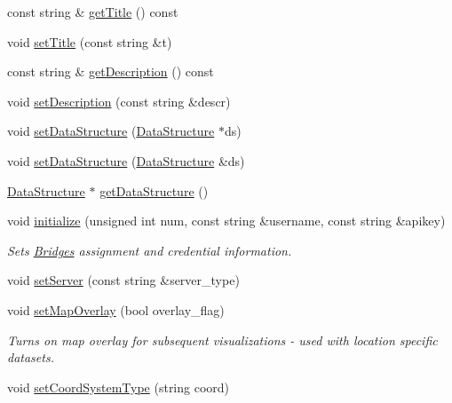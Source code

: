 \begin{DoxyCompactItemize}
\item 
const string \& \hyperlink{classbridges_1_1_bridges_a8fe8c79b0f852c0049a699c801e40a61}{get\+Title} () const
\item 
void \hyperlink{classbridges_1_1_bridges_ac9f2e0b5fd5c70053db233dcbb636b56}{set\+Title} (const string \&t)
\item 
const string \& \hyperlink{classbridges_1_1_bridges_ae9f238e1d9fc421c6c08aacb74e0ef6c}{get\+Description} () const
\item 
void \hyperlink{classbridges_1_1_bridges_aa26285a4d04c2759113dcf233406a8da}{set\+Description} (const string \&descr)
\item 
void \hyperlink{classbridges_1_1_bridges_a7447e2d5808c492d26132690c1a639a7}{set\+Data\+Structure} (\hyperlink{classbridges_1_1datastructure_1_1_data_structure}{Data\+Structure} $\ast$ds)
\item 
void \hyperlink{classbridges_1_1_bridges_a40c30470565f76310b5a8aea80dcab3c}{set\+Data\+Structure} (\hyperlink{classbridges_1_1datastructure_1_1_data_structure}{Data\+Structure} \&ds)
\item 
\hyperlink{classbridges_1_1datastructure_1_1_data_structure}{Data\+Structure} $\ast$ \hyperlink{classbridges_1_1_bridges_a5ddfb17c2fb2d3ca89e7564677251dea}{get\+Data\+Structure} ()
\item 
void \hyperlink{classbridges_1_1_bridges_a507ee9983331d23829cfc60fd13ead78}{initialize} (unsigned int num, const string \&username, const string \&apikey)
\begin{DoxyCompactList}\small\item\em Sets \hyperlink{classbridges_1_1_bridges}{Bridges} assignment and credential information. \end{DoxyCompactList}\item 
void \hyperlink{classbridges_1_1_bridges_afa05302cf91c91b902aef693525107a5}{set\+Server} (const string \&server\+\_\+type)
\item 
void \hyperlink{classbridges_1_1_bridges_a221442c674b625a403486076cf8a7c03}{set\+Map\+Overlay} (bool overlay\+\_\+flag)
\begin{DoxyCompactList}\small\item\em Turns on map overlay for subsequent visualizations -\/ used with location specific datasets. \end{DoxyCompactList}\item 
void \hyperlink{classbridges_1_1_bridges_ad00c07d3a028110424909081a94c4013}{set\+Coord\+System\+Type} (string coord)
\item 

\end{DoxyCompactItemize}
